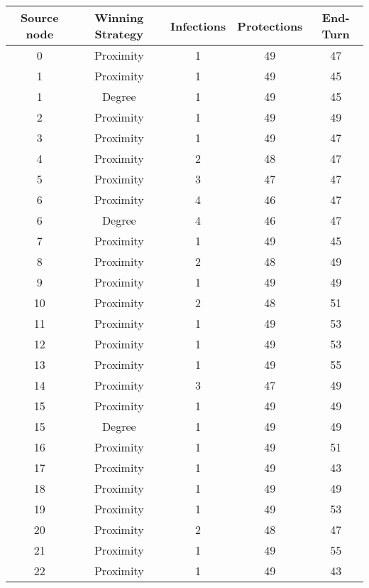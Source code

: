 \documentclass[results.tex]{subfiles}
\begin{document}
\begin{center}
  \begin{tabular}{| c || c | c | c | c |}
    \hline
    {\bfseries Source node} & {\bfseries Winning Strategy} & {\bfseries Infections} & {\bfseries Protections} & {\bfseries End-Turn} \\  %
    \hline\hline
    0 & Proximity & 1 & 49 & 47 \\ 
    \hline
    1 & Proximity & 1 & 49 & 45 \\ 
    \hline
    1 & Degree & 1 & 49 & 45 \\ 
    \hline
    2 & Proximity & 1 & 49 & 49 \\ 
    \hline
    3 & Proximity & 1 & 49 & 47 \\ 
    \hline
    4 & Proximity & 2 & 48 & 47 \\ 
    \hline
    5 & Proximity & 3 & 47 & 47 \\ 
    \hline
    6 & Proximity & 4 & 46 & 47 \\ 
    \hline
    6 & Degree & 4 & 46 & 47 \\ 
    \hline
    7 & Proximity & 1 & 49 & 45 \\ 
    \hline
    8 & Proximity & 2 & 48 & 49 \\ 
    \hline
    9 & Proximity & 1 & 49 & 49 \\ 
    \hline
    10 & Proximity & 2 & 48 & 51 \\ 
    \hline
    11 & Proximity & 1 & 49 & 53 \\ 
    \hline
    12 & Proximity & 1 & 49 & 53 \\ 
    \hline
    13 & Proximity & 1 & 49 & 55 \\ 
    \hline
    14 & Proximity & 3 & 47 & 49 \\ 
    \hline
    15 & Proximity & 1 & 49 & 49 \\ 
    \hline
    15 & Degree & 1 & 49 & 49 \\ 
    \hline
    16 & Proximity & 1 & 49 & 51 \\ 
    \hline
    17 & Proximity & 1 & 49 & 43 \\ 
    \hline
    18 & Proximity & 1 & 49 & 49 \\ 
    \hline
    19 & Proximity & 1 & 49 & 53 \\ 
    \hline
    20 & Proximity & 2 & 48 & 47 \\ 
    \hline
    21 & Proximity & 1 & 49 & 55 \\ 
    \hline
    22 & Proximity & 1 & 49 & 43 \\ 

\end{tabular}
\end{center}
\end{document}
